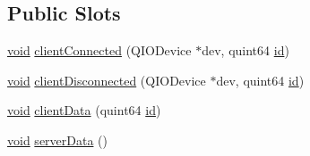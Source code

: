 \subsection*{Public Slots}
\begin{DoxyCompactItemize}
\item 
\hyperlink{group___u_a_v_objects_plugin_ga444cf2ff3f0ecbe028adce838d373f5c}{void} \hyperlink{class_qxt_r_p_c_service_private_a9db15f7f261b281f31c8b14917592372}{client\-Connected} (Q\-I\-O\-Device $\ast$dev, quint64 \hyperlink{glext_8h_a58c2a664503e14ffb8f21012aabff3e9}{id})
\item 
\hyperlink{group___u_a_v_objects_plugin_ga444cf2ff3f0ecbe028adce838d373f5c}{void} \hyperlink{class_qxt_r_p_c_service_private_a4b82721a38486a3a935869b2b82d7ed6}{client\-Disconnected} (Q\-I\-O\-Device $\ast$dev, quint64 \hyperlink{glext_8h_a58c2a664503e14ffb8f21012aabff3e9}{id})
\item 
\hyperlink{group___u_a_v_objects_plugin_ga444cf2ff3f0ecbe028adce838d373f5c}{void} \hyperlink{class_qxt_r_p_c_service_private_ac4d836b73eda2af57b8859d3e4dc6dc1}{client\-Data} (quint64 \hyperlink{glext_8h_a58c2a664503e14ffb8f21012aabff3e9}{id})
\item 
\hyperlink{group___u_a_v_objects_plugin_ga444cf2ff3f0ecbe028adce838d373f5c}{void} \hyperlink{class_qxt_r_p_c_service_private_ad7c765066a4c1d6fda6c0913f037ca74}{server\-Data} ()
\end{DoxyCompactItemize}

